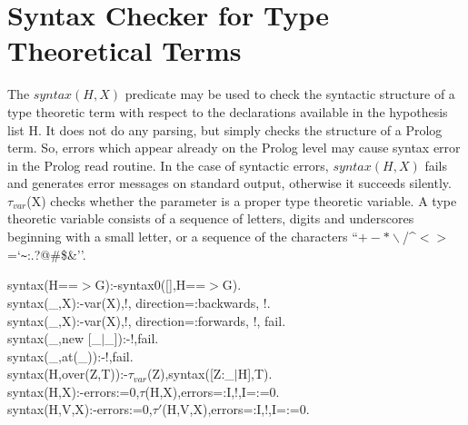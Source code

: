 \documentclass[11pt]{report}
\makeatletter
\newcommand{\ulinv}[1]{\index{#1@\texttt{#1}}}
\makeatother
\begin{document}
 \section{Syntax Checker for Type Theoretical Terms}
 \sloppypar
 The $syntax(H,X)$ predicate may be used to check the syntactic
 structure of a type theoretic term with respect to the 
 declarations available in the hypothesis list H. 
 It does not do any parsing,
 but simply checks the structure of a Prolog term. So, errors which
 appear already on the Prolog level may cause syntax error in
 the Prolog read routine. In the case of syntactic errors,
 $syntax(H,X)$ fails and generates error messages on standard output,
 otherwise it succeeds silently.
 $\tau_{var}$(X) checks whether the parameter is a proper type theoretic
 variable.
 A type theoretic variable consists of a sequence of letters, digits
 and underscores beginning with a small letter, or a sequence of the
 characters \hbox{``$+-*\backslash$/\^{}$<>$=`\verb`~`:.?@\#\$\&''}.
 \ulinv{syntax}
\begin{sf}\begin{tabbing}
syntax(H==$>$G):-syntax0([],H==$>$G).  \\[-0.15ex]
syntax(\_\hspace{0.1em},X):-var(X),!, direction=:backwards, !.\\[-0.15ex]
syntax(\_\hspace{0.1em},X):-var(X),!, direction=:forwards, !, fail.\\[-0.15ex]
syntax(\_\hspace{0.1em},new [\_\hspace{0.1em}$\mid$\_\hspace{0.1em}]):-!,fail.\\[-0.15ex]
syntax(\_\hspace{0.1em},at(\_\hspace{0.1em})):-!,fail.\\[-0.15ex]
syntax(H,over(Z,T)):-$\tau_{var}$(Z),syntax([Z:\_\hspace{0.1em}$\mid$H],T).\\[-0.15ex]
syntax(H,X):-errors:=0,$\tau$(H,X),errors=:I,!,I=:=0.\\[-0.15ex]
syntax(H,V,X):-errors:=0,$\tau'$(H,V,X),errors=:I,!,I=:=0.\\[-0.7ex]

\end{tabbing}\end{sf}
\end{document}
